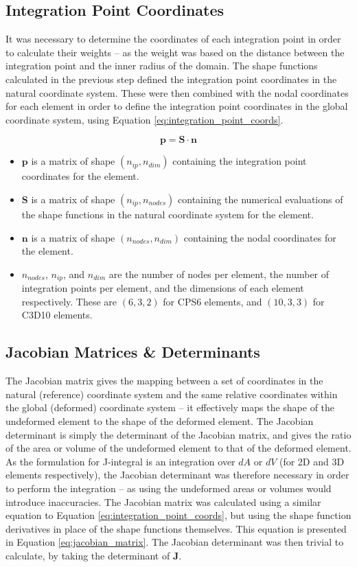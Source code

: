 \subsection{Integration Point Coordinates}

It was necessary to determine the coordinates of each integration point in order to calculate their weights -- as the weight was based on the distance between the integration point and the inner radius of the domain. The shape functions calculated in the previous step defined the integration point coordinates in the natural coordinate system. These were then combined with the nodal coordinates for each element in order to define the integration point coordinates in the global coordinate system, using Equation \ref{eq:integration_point_coords}.

\begin{equation}\label{eq:integration_point_coords}
	\bm{p} = \bm{S} \cdot \bm{n}
\end{equation}

\begin{itemize}
	\item $\bm{p}$ is a matrix of shape $(n_{ip}, n_{dim})$ containing the integration point coordinates for the element.
	\item $\bm{S}$ is a matrix of shape $(n_{ip}, n_{nodes})$ containing the numerical evaluations of the shape functions in the natural coordinate system for the element.
	\item $\bm{n}$ is a matrix of shape $(n_{nodes}, n_{dim})$ containing the nodal coordinates for the element.
	\item $n_{nodes}$, $n_{ip}$, and $n_{dim}$ are the number of nodes per element, the number of integration points per element, and the dimensions of each element respectively. These are $(6, 3, 2)$ for CPS6 elements, and $(10, 3, 3)$ for C3D10 elements.
\end{itemize}

\subsection{Jacobian Matrices \& Determinants}

The Jacobian matrix gives the mapping between a set of coordinates in the natural (reference) coordinate system and the same relative coordinates within the global (deformed) coordinate system  -- it effectively maps the shape of the undeformed element to the shape of the deformed element. The Jacobian determinant is simply the determinant of the Jacobian matrix, and gives the ratio of the area or volume of the undeformed element to that of the deformed element. As the formulation for J-integral is an integration over $dA$ or $dV$ (for 2D and 3D elements respectively), the Jacobian determinant was therefore necessary in order to perform the integration -- as using the undeformed areas or volumes would introduce inaccuracies. The Jacobian matrix was calculated using a similar equation to Equation \ref{eq:integration_point_coords}, but using the shape function derivatives in place of the shape functions themselves. This equation is presented in Equation \ref{eq:jacobian_matrix}. The Jacobian determinant was then trivial to calculate, by taking the determinant of $\bm{J}$.

